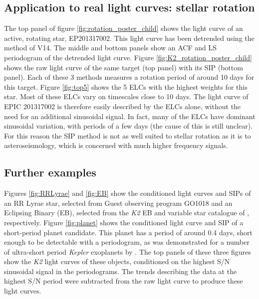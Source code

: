 \documentclass[useAMS, usenatbib, preprint, 12pt]{aastex}
\begin{document}
\subsection{Application to real light curves: stellar rotation}
The top panel of figure \ref{fig:rotation_poster_child} shows the light curve
of an active, rotating star, EP201317002.
This light curve has been detrended using the method of
V14.
The middle and bottom panels show an ACF and LS periodogram of the
detrended light curve.
Figure \ref{fig:K2_rotation_poster_child} shows the raw light curve of the
same target (top panel) with its SIP (bottom panel).
Each of these 3 methods measures a rotation period of around 10 days for this
target.
Figure \ref{fig:top5} shows the 5 ELCs with the highest weights for this star.
Most of these ELCs vary on timescales close to 10 days.
The light curve of EPIC 201317002 is therefore easily described by the ELCs
alone, without the need for an additional sinusoidal signal.
In fact, many of the ELCs have dominant sinusoidal variation, with periods
of a few days (the cause of this is still unclear).
For this reason the SIP method is not as well suited to stellar rotation as it
is to asteroseismology, which is concerned with much higher frequency signals.

\subsection{Further examples}
Figures \ref{fig:RRLyrae} and \ref{fig:EB} show the conditioned light curves
and SIPs of an RR Lyrae star, selected from Guest observing program GO1018 and
an Eclipsing Binary (EB), selected from the {\it K2} EB and variable star
catalogue of \citet{Armstrong2015}, respectively.
Figure \ref{fig:planet} shows the conditioned light curve and SIP of a
short-period planet candidate.
This planet has a period of around 0.4 days, short enough to be detectable
with a periodogram, as was demonstrated for a number of ultra-short
period {\it Kepler} exoplanets by \citet{Sanchis-Ojeda2014}.
The top panels of these three figures show the {\it K2} light curves of these
objects, conditioned on the highest S/N sinusoidal signal in the
periodograms.
The trends describing the data at the highest S/N period were subtracted from
the raw light curve to produce these light curves.
\end{document}

